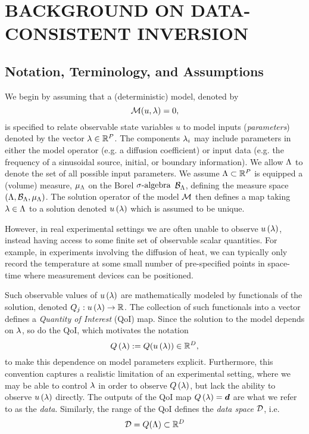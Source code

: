 \chapter{\uppercase{Background on Data-Consistent Inversion} \label{chapter:02}}

\section{Notation, Terminology, and Assumptions}
We begin by assuming that a (deterministic) model, denoted by $$\mathcal{M} (u, \lambda) = 0,$$ is specified to relate observable state variables $u$ to model inputs ({\em parameters}) denoted by the vector $\lambda\in\mathbb{R}^P$.
The components $\lambda_i$ may include parameters in either the model operator (e.g. a diffusion coefficient) or input data (e.g. the frequency of a sinusoidal source, initial, or boundary information).
We allow ${\Lambda}$ to denote the set of all possible input parameters.
We assume ${\Lambda}\subset\mathbb{R}^P$ is equipped a (volume) measure, $\mu_{{\Lambda}}$ on the Borel $\sigma\text{-algebra}$ $\mathcal{B}_{{\Lambda}}$, defining the measure space $({\Lambda}, \mathcal{B}_{{\Lambda}}, \mu_{{\Lambda}})$.
The solution operator of the model $\mathcal{M}$ then defines a map taking $\lambda\in{\Lambda}$ to a solution denoted $u\left ( \lambda \right )$ which is assumed to be unique.

However, in real experimental settings we are often unable to observe $u\left ( \lambda \right )$, instead having access to some finite set of observable scalar quantities.
For example, in experiments involving the diffusion of heat, we can typically only record the temperature at some small number of pre-specified points in space-time where measurement devices can be positioned.

Such observable values of $u\left ( \lambda \right )$ are mathematically modeled by functionals of the solution, denoted $Q_j: u\left ( \lambda \right ) \to \mathbb{R}$.
The collection of such functionals into a vector defines a {\em Quantity of Interest} (QoI) map.
Since the solution to the model depends on $\lambda$, so do the QoI, which motivates the notation
$$Q\left ( \lambda \right ) := Q( u\left ( \lambda \right ) ) \in\mathbb{R}^D,$$
to make this dependence on model parameters explicit.
Furthermore, this convention captures a realistic limitation of an experimental setting, where we may be able to control $\lambda$ in order to observe $Q\left ( \lambda \right )$, but lack the ability to observe $u\left ( \lambda \right )$ directly.
The outputs of the QoI map $Q\left ( \lambda \right ) = \operatorname*{\boldsymbol{d}}$ are what we refer to as the \emph{data}.
Similarly, the range of the QoI defines the \emph{data space} $\mathcal{D}$, i.e.
$$\mathcal{D} = Q({\Lambda}) \subset \mathbb{R}^D$$

